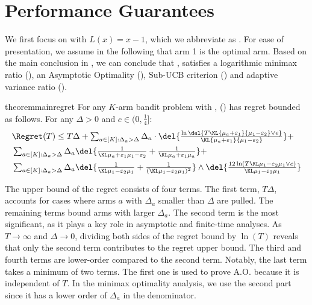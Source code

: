 \section{Performance Guarantees}
We first focus on  with $L(x) = x-1$, which we abbreviate as \expklms.
For ease of presentation, we assume in the following that arm 1 is the optimal arm.
Based on the main conclusion in , we can conclude that , \expklms satisfies a logarithmic minimax ratio (), an Asymptotic Optimality (), Sub-UCB criterion () and adaptive variance ratio ().

\begin{restatable}{theorem}{mainregret} \label{thm:expected-regret-total}
    For any $K$-arm bandit problem with , \expklms () has regret bounded as follows. 
    For any $\Delta > 0$ and $c \in (0, \frac{1}{4}]$: 
    \begin{align}
        &\Regret(T) \leq T\Delta + \textstyle \sum_{a\in[K]:\Delta_a > \Delta} \Delta_a \cdot \del{\frac{\ln\del{T\KL{\mu_a+\varepsilon_1}{\mu_1-\varepsilon_2} \vee e}}{\KL{\mu_a+\varepsilon_1}{\mu_1-\varepsilon_2}}} +
            \nonumber
        \\
        &
        \textstyle \sum_{a\in[K]: \Delta_a > \Delta} \Delta_a \del{\GoodEventBound + \ExpFTwo} +
            \nonumber
        \\
        &
        \textstyle \sum_{a\in[K]: \Delta_a > \Delta} \Delta_a \del{\BadEventThreeBoundForAO} \wedge
        \del{\BadEventThreeBoundForMO}
        \label{eqn:exp-kl-ms-main-regret}
    \end{align}
\end{restatable}

The upper bound of the regret consists of four terms. The first term, $T\Delta$, accounts for cases where arms $a$ with $\Delta_a$ smaller than $\Delta$ are pulled. The remaining terms bound arms with larger $\Delta_a$. The second term is the most significant, as it plays a key role in asymptotic and finite-time analyses. 
As $T \to \infty$ and $\Delta \to 0$, dividing both sides of the regret bound by $\ln(T)$ reveals that only the second term contributes to the regret upper bound. The third and fourth terms are lower-order compared to the second term.
Notably, the last term takes a minimum of two terms. The first one is used to prove A.O. because it is independent of $T$. In the minimax optimality analysis, we use the second part since it has a lower order of $\Delta_a$ in the denominator.

